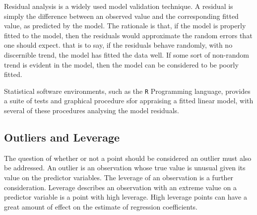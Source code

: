 \documentclass[12pt, a4paper]{report}
\theoremstyle{plain}
\theoremstyle{definition}
\theoremstyle{remark}
\begin{document}

Residual analysis is a widely used model validation technique. A residual is simply the difference between an observed value and the corresponding fitted value, as predicted by the model. The rationale is that, if the model is properly fitted to the model, then the residuals would approximate the random errors that one should expect.
that is to say, if the residuals behave randomly, with no discernible trend, the model has fitted the data well. If some sort of non-random trend is evident in the model, then the model can be considered to be poorly fitted.


Statistical software environments, such as the \texttt{R} Programming language, provides a suite of tests and graphical procedure sfor appraising a fitted linear model, with several 
of these procedures analysing the model residuals.



 

\subsection{Outliers and Leverage}



The question of whether or not a point should be considered an outlier must also be addressed. An outlier is an observation whose true value is unusual given its value on the predictor variables. The leverage of an observation is a further consideration. Leverage describes an observation with an extreme value on a predictor variable is a point with high leverage. High leverage points can have a great amount of effect on the estimate of regression coefficients.
\end{document}
